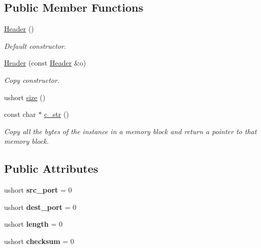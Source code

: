 \subsection*{Public Member Functions}
\begin{DoxyCompactItemize}
\item 
\hyperlink{structudp_1_1Header_a47e86aabf149c64ede0cc55ed8888bff}{Header} ()
\begin{DoxyCompactList}\small\item\em Default constructor. \end{DoxyCompactList}\item 
\hyperlink{structudp_1_1Header_a4834b505432f80ca2eb9db6d51ab2c00}{Header} (const \hyperlink{structudp_1_1Header}{Header} \&o)
\begin{DoxyCompactList}\small\item\em Copy constructor. \end{DoxyCompactList}\item 
ushort \hyperlink{structudp_1_1Header_aeb0e9c82b2e6471758d8731ed590a502}{size} ()
\item 
const char $\ast$ \hyperlink{structudp_1_1Header_a9e39bb61a6c644edb6861f8fcb7b927d}{c\+\_\+str} ()
\begin{DoxyCompactList}\small\item\em Copy all the bytes of the instance in a memory block and return a pointer to that memory block. \end{DoxyCompactList}\end{DoxyCompactItemize}
\subsection*{Public Attributes}
\begin{DoxyCompactItemize}
\item 
ushort {\bfseries src\+\_\+port} = 0\hypertarget{structudp_1_1Header_ae751d4065b7ffd06ca2aee668efaea93}{}\label{structudp_1_1Header_ae751d4065b7ffd06ca2aee668efaea93}

\item 
ushort {\bfseries dest\+\_\+port} = 0\hypertarget{structudp_1_1Header_ac27f21b3a306cd9fbb82aa59183da569}{}\label{structudp_1_1Header_ac27f21b3a306cd9fbb82aa59183da569}

\item 
ushort {\bfseries length} = 0\hypertarget{structudp_1_1Header_abb666da1f6ca9da00addcf288b79dabe}{}\label{structudp_1_1Header_abb666da1f6ca9da00addcf288b79dabe}

\item 
ushort {\bfseries checksum} = 0\hypertarget{structudp_1_1Header_aeb4dde21af1f921c94c8fb1106dfbf05}{}\label{structudp_1_1Header_aeb4dde21af1f921c94c8fb1106dfbf05}

\end{DoxyCompactItemize}


